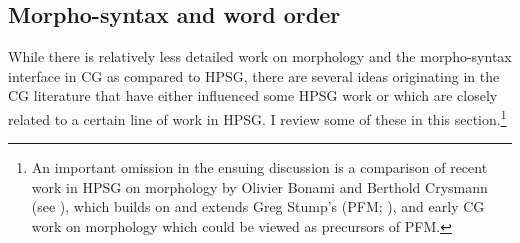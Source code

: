 \documentclass[output=paper
                ,modfonts
 	        ,biblatex
                ,babelshorthands
                ,newtxmath
                ,draftmode
                ,colorlinks, citecolor=brown
]{langscibook}
\begin{document}




\subsection{Morpho-syntax and word order \label{sec:morphology}}

While there is relatively less detailed work on morphology and the
morpho-syntax interface in CG as compared to HPSG, there are several
ideas originating in the CG literature that have either
influenced some HPSG work or which are closely related to a certain
line of work in HPSG. I review some of these in this
section.\footnote{An important omission in the ensuing discussion is a
comparison of recent work in HPSG on morphology by Olivier Bonami and
Berthold Crysmann (see ), which builds on
and extends Greg Stump's  (PFM;
\citealt{Stump2001a}), and early CG work on morphology
\citep{hoeksema-diss,moortgat84,hoeksemajanda88,raffelsiefen92} which
could be viewed as precursors of PFM.}

\end{document}
